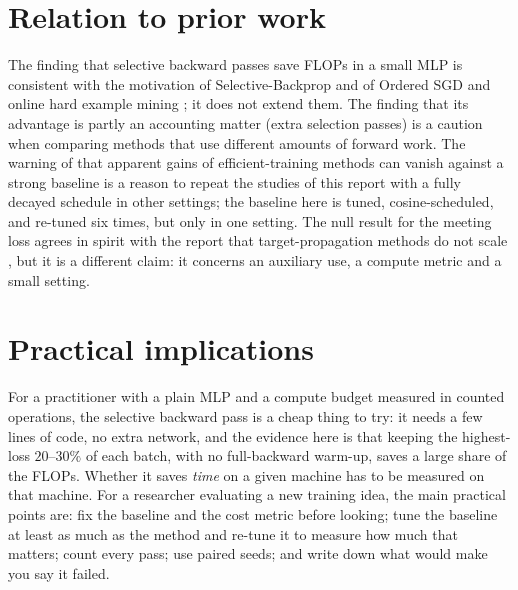 \section{Relation to prior work}
The finding that selective backward passes save FLOPs in a small MLP is consistent with the motivation of Selective-Backprop \citep{jiang2019selective} and of Ordered SGD and online hard example mining \citep{kawaguchi2020ordered,shrivastava2016ohem}; it does not extend them. The finding that its advantage is partly an accounting matter (extra selection passes) is a caution when comparing methods that use different amounts of forward work. The warning of \citet{kaddour2023notrain} that apparent gains of efficient-training methods can vanish against a strong baseline is a reason to repeat the studies of this report with a fully decayed schedule in other settings; the baseline here is tuned, cosine-scheduled, and re-tuned six times, but only in one setting. The null result for the meeting loss agrees in spirit with the report that target-propagation methods do not scale \citep{bartunov2018assessing}, but it is a different claim: it concerns an auxiliary use, a compute metric and a small setting.

\section{Practical implications}
For a practitioner with a plain MLP and a compute budget measured in counted operations, the selective backward pass is a cheap thing to try: it needs a few lines of code, no extra network, and the evidence here is that keeping the highest-loss $20$--$30\%$ of each batch, with no full-backward warm-up, saves a large share of the FLOPs. Whether it saves \emph{time} on a given machine has to be measured on that machine. For a researcher evaluating a new training idea, the main practical points are: fix the baseline and the cost metric before looking; tune the baseline at least as much as the method and re-tune it to measure how much that matters; count every pass; use paired seeds; and write down what would make you say it failed.
